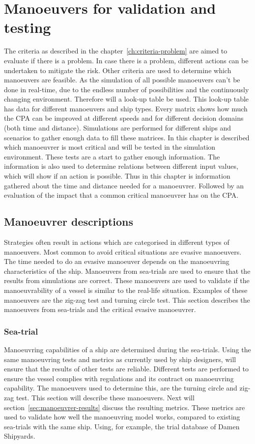 \chapter{Manoeuvers for validation and testing}
\label{ch:criteria-manouvre}
The criteria as described in the chapter~\ref{ch:criteria-problem} are aimed to evaluate if there is a problem. In case there is a problem, different actions can be undertaken to mitigate the risk. Other criteria are used to determine which manoeuvers are feasible. As the simulation of all possible manoeuvers can't be done in real-time, due to the endless number of possibilities and the continuously changing environment. Therefore will a look-up table be used. This look-up table has data for different manoeuvers and ship types. Every matrix shows how much the CPA can be improved at different speeds and for different decision domains (both time and distance).
Simulations are performed for different ships and scenarios to gather enough data to fill these matrices. In this chapter is described which manoeuvrer is most critical and will be tested in the simulation environment. These tests are a start to gather enough information. The information is also used to determine relations between different input values, which will show if an action is possible. Thus in this chapter is information gathered about the time and distance needed for a manoeuvrer. Followed by an evaluation of the impact that a common critical manoeuvrer has on the CPA.

\section{Manoeuvrer descriptions}
\label{sec:manoeuvrer-description}
Strategies often result in actions which are categorised in different types of manoeuvers. Most common to avoid critical situations are evasive manoeuvers. The time needed to do an evasive manoeuver depends on the manoeuvring characteristics of the ship. Manoeuvers from sea-trials are used to ensure that the results from simulations are correct. These manoeuvers are used to validate if the manoeuvrability of a vessel is similar to the real-life situation. Examples of these manoeuvers are the zig-zag test and turning circle test. This section describes the manoeuvers from sea-trials and the critical evasive manoeuvrer.

\subsection{Sea-trial}
Manoeuvring capabilities of a ship are determined during the sea-trials. Using the same manoeuvring tests and metrics as currently used by ship designers, will ensure that the results of other tests are reliable. Different tests are performed to ensure the vessel complies with regulations and its contract on manoeuvring capability. The manoeuvers used to determine this, are the turning circle and zig-zag test. This section will describe these manoeuvers. Next will section~\ref{sec:manoeuvrer-results} discuss the resulting metrics. These metrics are used to validate how well the manoeuvring model works, compared to existing sea-trials with the same ship. Using, for example, the trial database of Damen Shipyards.

